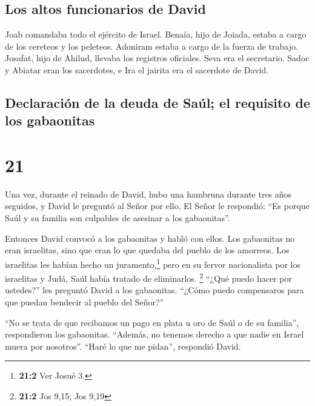 \hypertarget{los-altos-funcionarios-de-david}{%
\subsection{Los altos funcionarios de
David}\label{los-altos-funcionarios-de-david}}

 Joab comandaba todo el ejército de Israel. Benaía, hijo
de Joiada, estaba a cargo de los cereteos y los peleteos.
 Adoniram estaba a cargo de la fuerza de trabajo.
Josafat, hijo de Ahilud, llevaba los registros oficiales.
 Seva era el secretario. Sadoc y Abiatar eran los
sacerdotes,  e Ira el jairita era el sacerdote de David.

\hypertarget{declaraciuxf3n-de-la-deuda-de-sauxfal-el-requisito-de-los-gabaonitas}{%
\subsection{Declaración de la deuda de Saúl; el requisito de los
gabaonitas}\label{declaraciuxf3n-de-la-deuda-de-sauxfal-el-requisito-de-los-gabaonitas}}

\hypertarget{section-20}{%
\section{21}\label{section-20}}

 Una vez, durante el reinado de David, hubo una hambruna
durante tres años seguidos, y David le preguntó al Señor por ello. El
Señor le respondió: ``Es porque Saúl y su familia son culpables de
asesinar a los gabaonitas''.

 Entonces David convocó a los gabaonitas y habló con
ellos. Los gabaonitas no eran israelitas, sino que eran lo que quedaba
del pueblo de los amorreos. Los israelitas les habían hecho un
juramento,\footnote{\textbf{21:2} Ver Josué 3.} pero en su fervor
nacionalista por los israelitas y Judá, Saúl había tratado de
eliminarlos. \footnote{\textbf{21:2} Jos 9,15; Jos 9,19} 
``¿Qué puedo hacer por ustedes?'' les preguntó David a los gabaonitas.
``¿Cómo puedo compensaros para que puedan bendecir al pueblo del
Señor?''

 ``No se trata de que recibamos un pago en plata u oro de
Saúl o de su familia'', respondieron los gabaonitas. ``Además, no
tenemos derecho a que nadie en Israel muera por nosotros''. ``Haré lo
que me pidan'', respondió David.

